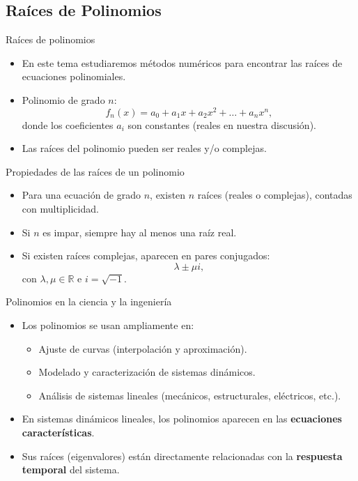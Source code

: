 \documentclass[../../main.tex]{subfiles}
\begin{document}
\subsection{Raíces de Polinomios}

\begin{frame}{Raíces de polinomios}
  \begin{itemize}
    \item En este tema estudiaremos métodos numéricos para encontrar las raíces de ecuaciones polinomiales.
    \item Polinomio de grado \(n\):
    \[
      f_n(x) = a_0 + a_1 x + a_2 x^2 + \dots + a_n x^n,
    \]
    donde los coeficientes \(a_i\) son constantes (reales en nuestra discusión).
    \item Las raíces del polinomio pueden ser reales y/o complejas.
  \end{itemize}
\end{frame}

\begin{frame}{Propiedades de las raíces de un polinomio}
  \begin{itemize}
    \item Para una ecuación de grado \(n\), existen \(n\) raíces (reales o complejas), contadas con multiplicidad.
    \item Si \(n\) es impar, siempre hay al menos una raíz real.
    \item Si existen raíces complejas, aparecen en pares conjugados:
    \[
      \lambda \pm \mu i,
    \]
    con \(\lambda, \mu \in \mathbb{R}\) e \(i = \sqrt{-1}\).
  \end{itemize}
\end{frame}

\begin{frame}{Polinomios en la ciencia y la ingeniería}
  \begin{itemize}
    \item Los polinomios se usan ampliamente en:
    \begin{itemize}
      \item Ajuste de curvas (interpolación y aproximación).
      \item Modelado y caracterización de sistemas dinámicos.
      \item Análisis de sistemas lineales (mecánicos, estructurales, eléctricos, etc.).
    \end{itemize}
    \item En sistemas dinámicos lineales, los polinomios aparecen en las \textbf{ecuaciones características}.
    \item Sus raíces (eigenvalores) están directamente relacionadas con la \textbf{respuesta temporal} del sistema.
  \end{itemize}
\end{frame}
\end{document}
